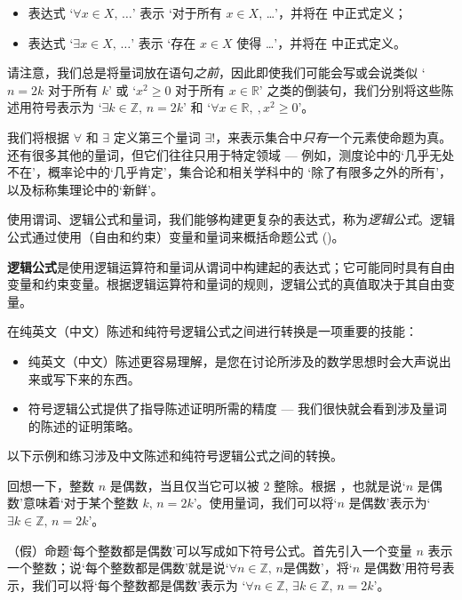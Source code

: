 \begin{itemize}
\item 表达式 `$\forall x \in X,\, \dots{}$' 表示 `对于所有 $x \in X$, \dots{}'，并将在  中正式定义；
\item 表达式 `$\exists x \in X,\, \dots{}$' 表示 `存在 $x \in X$ 使得 \dots{}'，并将在  中正式定义。
\end{itemize}

请注意，我们总是将量词放在语句\textit{之前}，因此即使我们可能会写或会说类似 `$n=2k$ 对于所有 $k$' 或 `$x^2 \ge 0$ 对于所有 $x \in \mathbb{R}$' 之类的倒装句，我们分别将这些陈述用符号表示为 `$\exists k \in \mathbb{Z},\, n=2k$' 和 `$\forall x \in \mathbb{R},\ , x^2 \ge 0$'。

我们将根据 $\forall$ 和 $\exists$ 定义第三个量词 $\exists !$，来表示集合中\textit{只有}一个元素使命题为真。还有很多其他的量词，但它们往往只用于特定领域 --- 例如，测度论中的`几乎无处不在'，概率论中的`几乎肯定'，集合论和相关学科中的 `除了有限多之外的所有'，以及标称集理论中的`新鲜'。 

使用谓词、逻辑公式和量词，我们能够构建更复杂的表达式，称为\textit{逻辑公式}。逻辑公式通过使用（自由和约束）变量和量词来概括命题公式 ()。

\begin{definition}
\label{defLogicalFormula}
\textbf{逻辑公式}是使用逻辑运算符和量词从谓词中构建起的表达式；它可能同时具有自由变量和约束变量。根据逻辑运算符和量词的规则，逻辑公式的真值取决于其自由变量。
\end{definition}

在纯英文（中文）陈述和纯符号逻辑公式之间进行转换是一项重要的技能：
\begin{itemize}
\item 纯英文（中文）陈述更容易理解，是您在讨论所涉及的数学思想时会大声说出来或写下来的东西。
\item 符号逻辑公式提供了指导陈述证明所需的精度 --- 我们很快就会看到涉及量词的陈述的证明策略。
\end{itemize}

以下示例和练习涉及中文陈述和纯符号逻辑公式之间的转换。

\begin{example}
回想一下，整数 $n$ 是偶数，当且仅当它可以被 $2$ 整除。根据 ，也就是说`$n$ 是偶数'意味着`对于某个整数 $k$, $n=2k$'。使用量词，我们可以将`$n$ 是偶数'表示为`$\exists k \in \mathbb{Z},\, n=2k$'。

（假）命题`每个整数都是偶数'可以写成如下符号公式。首先引入一个变量 $n$ 表示一个整数；说`每个整数都是偶数'就是说`$\forall n \in \mathbb{Z},\, n \text{是偶数}$'，将`$n$ 是偶数'用符号表示，我们可以将`每个整数都是偶数'表示为 `$\forall n \in \mathbb{Z},\, \exists k \in \mathbb{Z},\, n=2k$'。
\end{example}

